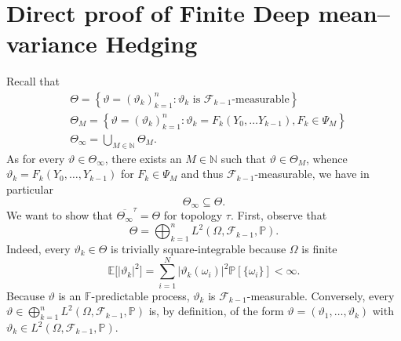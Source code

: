\documentclass[11pt,a4paper,twoside,openany]{report}
\numberwithin{equation}{section}
\theoremstyle{plain} %
\theoremstyle{definition} %
\theoremstyle{remark} %
\begin{document}
\section{Direct proof of Finite Deep mean--variance Hedging}\label{Appendix:Direct proof of Finite Deep mean--variance Hedging}
    Recall that 
    \begin{align*}
        &\Theta=\left\{\vartheta=(\vartheta_k)_{k=1}^n:\vartheta_k \text{ is }\mathcal{F}_{k-1}\text{-measurable}\right\}\\
        &\Theta_M=\left\{\vartheta=(\vartheta_k)_{k=1}^n:\vartheta_k=F_k(Y_0,\dots Y_{k-1}),F_k\in\Psi_M\right\}\\
        &\Theta_{\infty}=\bigcup_{M\in\mathbb{N}}\Theta_M.
    \end{align*}
    As for every \(\vartheta\in\Theta_{\infty}\), there exists an \(M\in\mathbb{N}\) such that \(\vartheta\in\Theta_M\), whence \(\vartheta_k=F_k(Y_0,\dots,Y_{k-1})\) for \(F_k\in\Psi_M\) and thus \(\mathcal{F}_{k-1}\)-measurable, we have in particular
    \begin{equation*}
        \Theta_{\infty}\subseteq\Theta.
    \end{equation*}
    We want to show that \(\overline{\Theta_{\infty}}^{\tau}=\Theta\) for topology \(\tau\).
   First, observe that 
    \begin{equation*}
    \Theta=\bigoplus_{k=1}^{n}L^2(\Omega,\mathcal{F}_{k-1},\mathbb{P}).
    \end{equation*}
    Indeed, every \(\vartheta_k\in\Theta\) is trivially square-integrable because \(\Omega\) is finite
    \begin{equation*}
        \mathbb{E}\big[|\vartheta_k|^2\big]=\sum_{i=1}^N|\vartheta_k(\omega_i)|^2\mathbb{P}[\{\omega_i\}]<\infty.
    \end{equation*}
    Because \(\vartheta\) is an \(\mathbb{F}\)-predictable process, \(\vartheta_k\) is \(\mathcal{F}_{k-1}\)-measurable. Conversely, every \(\vartheta\in\bigoplus_{k=1}^{n}L^2(\Omega,\mathcal{F}_{k-1},\mathbb{P})\) is, by definition, of the form \(\vartheta=(\vartheta_1,\dots,\vartheta_k)\) with \(\vartheta_k\in L^2(\Omega,\mathcal{F}_{k-1},\mathbb{P})\). 
\end{document}
